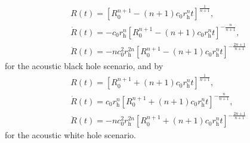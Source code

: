 \begin{align}
& R\left(t\right) = \left[R_0^{n+1} - \left(n+1\right)c_0r_{\mathrm{h}}^nt\right]^{\frac{1}{n+1}},
\label{eq:R} \\[4pt]
& \dot R\left(t\right) = -c_0r_{\mathrm{h}}^n\left[R_0^{n+1} - \left(n+1\right)c_0r_{\mathrm{h}}^nt\right]^{-\frac{n}{n+1}},
\label{eq:Rdot} \\[4pt]
& \ddot R\left(t\right) = -nc_0^2r_{\mathrm{h}}^{2n}\left[R_0^{n+1} - \left(n+1\right)c_0r_{\mathrm{h}}^nt\right]^{-\frac{2n+1}{n+1}}
\label{eq:Rddot}
\end{align}
for the acoustic black hole scenario, and by
\begin{align}
& R\left(t\right) = \left[R_0^{n+1} + \left(n+1\right)c_0r_{\mathrm{h}}^nt\right]^{\frac{1}{n+1}},
\label{eq:R_WH} \\[4pt]
& \dot R\left(t\right) = c_0r_{\mathrm{h}}^n\left[R_0^{n+1} + \left(n+1\right)c_0r_{\mathrm{h}}^nt\right]^{-\frac{n}{n+1}},
\label{eq:Rdot_WH} \\[4pt]
& \ddot R\left(t\right) = -nc_0^2r_{\mathrm{h}}^{2n}\left[R_0^{n+1} + \left(n+1\right)c_0r_{\mathrm{h}}^nt\right]^{-\frac{2n+1}{n+1}}
\label{eq:Rddot_WH}
\end{align}
for the acoustic white hole scenario.

